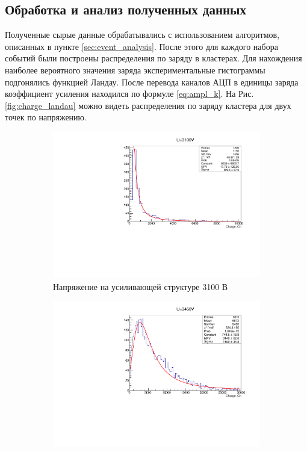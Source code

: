 \subsection{Обработка и анализ полученных данных}
Полученные сырые данные обрабатывались с использованием алгоритмов, описанных в пункте \ref{sec:event_analysis}. После этого для каждого набора событий были построены распределения по заряду в кластерах. Для нахождения наиболее вероятного значения заряда экспериментальные гистограммы подгонялись функцией Ландау. После перевода каналов АЦП в единицы заряда коэффициент усиления находился по формуле \ref{eq:ampl_k}. На Рис. \ref{fig:charge_landau} можно видеть распределения по заряду кластера для двух точек по напряжению. 
\begin{figure}[h]
\centering
\begin{subfigure}{.45\textwidth}
	\centering
	\includegraphics[width=1\linewidth]{img/3100.pdf}
	\caption{Напряжение на усиливающей структуре 3100 В}
\end{subfigure}%
\hspace{20pt}
\begin{subfigure}{.45\textwidth}
	\centering
	\includegraphics[width=1\linewidth]{img/3450.pdf}

\end{subfigure}
\end{figure}
